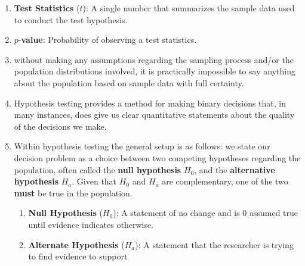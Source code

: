 \begin{enumerate}

    \item \textbf{Test Statistics} ($t$): A single number that summarizes the sample data used to conduct the test hypothesis.
    \hfill \cite{ctl.unm.edu/assets/docs/resources/hypothesis-testing-sheet.pdf}

    \item $p$-\textbf{value}: Probability of observing a test statistics.
    \hfill \cite{ctl.unm.edu/assets/docs/resources/hypothesis-testing-sheet.pdf}


    \item without making any assumptions regarding the sampling process and/or the population distributions involved, it is practically impossible to say anything about the population based on sample data with full certainty.
    \hfill \cite{statistics/book/Statistics-for-Data-Scientists/Maurits-Kaptein}

    \item Hypothesis testing provides a method for making binary decisions that, in many instances, does give us clear quantitative statements about the quality of the decisions we make.
    \hfill \cite{statistics/book/Statistics-for-Data-Scientists/Maurits-Kaptein}

    \item Within hypothesis testing the general setup is as follows: we state our decision problem as a choice between two competing hypotheses regarding the population, often called the \textbf{null hypothesis} $H_0 $, and the \textbf{alternative hypothesis} $H_a $.
    Given that $H_0$ and $H_a$ are complementary, one of the two \textbf{must} be true in the population.
    \hfill \cite{statistics/book/Statistics-for-Data-Scientists/Maurits-Kaptein}
    \begin{enumerate}
        \item \textbf{Null Hypothesis} ($H_0$): A statement of no change and is 0 assumed true until evidence indicates otherwise.
        \hfill \cite{ctl.unm.edu/assets/docs/resources/hypothesis-testing-sheet.pdf}

        \item \textbf{Alternate Hypothesis} ($H_a$): A statement that the researcher is trying to find evidence to support
        \hfill \cite{ctl.unm.edu/assets/docs/resources/hypothesis-testing-sheet.pdf}
    \end{enumerate}


\end{enumerate}
